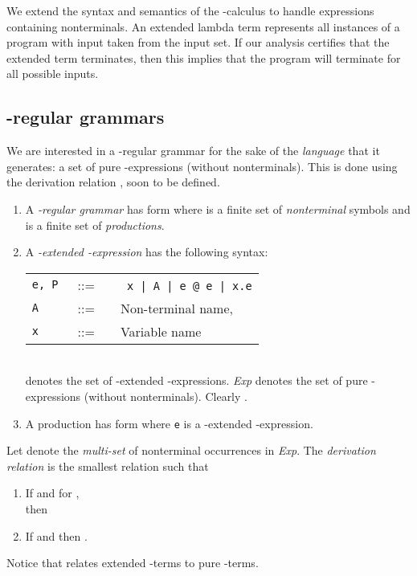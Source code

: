 \documentclass{LMCS}
\newcommand{\fl}{\noindent}
\newcommand{\vair}{\relax}
\newcommand{\be}{\begin{enumerate}}
\newcommand{\ee}{\end{enumerate}}
\newcommand{\bt}{\begin{tabular}}
\newcommand{\et}{\end{tabular}}
\newcommand{\bdfn}{\begin{defi}}
\newcommand{\edfn}{\end{defi}}
\theoremstyle{definition}\newtheorem{env}[thm]{Environment}
\begin{document}
We extend the syntax and semantics of the -calculus to handle expressions containing nonterminals. An extended lambda term represents all instances of a program with input taken from the input set. If our analysis certifies that the extended term terminates, then this implies that the program will terminate for all possible inputs.

\subsection{-regular grammars}

We are interested in a -regular grammar for the sake of the {\em language}  that it generates:
a set of pure -expressions (without nonterminals). This is done using the derivation relation , soon to be defined. 


\bdfn \label{def-lamda-reg}\hfill

\be[(1)]
\item A {\em -regular grammar} has form  where  is a
finite set of {\em nonterminal} symbols and  is a finite set of {\em productions}.
\bigskip

\item A {\em -extended  -expression} has the following syntax:\medskip

\bt{lcl}
{\tt e, P} &\ ::=\ &\  {\tt
x | A | e @ e | x.e}\\
{\tt A} &\ ::=\ &\  {\rm Non-terminal name, }\\
{\tt x} &\ ::=\ &\  {\rm Variable name}\\
\et\\

 \fl{\em Exp} denotes the set of -extended -expressions. {\em Exp} denotes the set of pure -expressions (without nonterminals). Clearly .
\bigskip


\item A production has form  where {\tt e}
is a  -extended  -expression. \ee
\edfn

\fl


\bdfn \label{prodstar}Let   denote the {\em multi-set} of nonterminal
occurrences in   {\em Exp}. 
The {\em derivation  relation }
 is  the
smallest relation such that

\be[(1)]
\item  If   and 
 for , \\then
\vair

\item If  and  then .
\vair
\ee
\edfn

Notice that  relates extended -terms to pure -terms.
\vair
\end{document}
